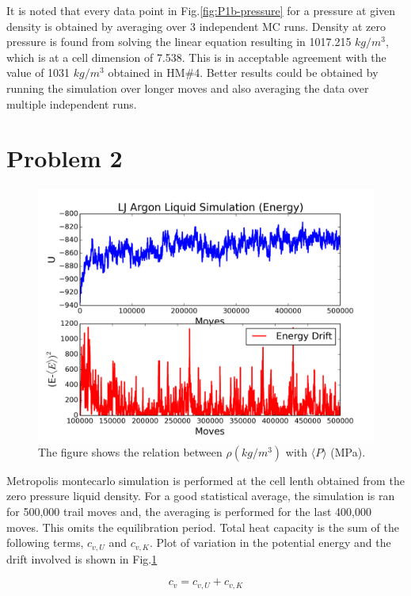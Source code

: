 \documentclass{article}
\begin{document}
It is noted that every data point in Fig.\ref{fig:P1b-pressure} for a pressure at given density is obtained by averaging over 3 independent MC runs. Density at zero pressure is found from solving the linear equation resulting in 1017.215 $kg/m^3$, which is at a cell dimension of 7.538. This is in acceptable agreement with the value of 1031 $kg/m^3$ obtained in HM\#4. Better results could be obtained by running the simulation over longer moves and also averaging the data over multiple independent runs.

\section{Problem 2}
\label{sec-2}
\begin{figure}[htb]
\centering
\includegraphics[width=.9\linewidth]{./P2/LJ-md-Ener.png}
\caption{\label{fig:P2}The figure shows the relation between $\rho(kg/m^3)$ with $\langle P \rangle$ (MPa).}
\end{figure}

Metropolis montecarlo simulation is performed at the cell lenth obtained from the zero pressure liquid density. For a good statistical average, the simulation is ran for 500,000 trail moves and, the averaging is performed for the last 400,000 moves. This omits the equilibration period. Total heat capacity is the sum of the following terms, $c_{v,U}$ and $c_{v,K}$. Plot of variation in the potential energy and the drift involved is shown in Fig.\ref{fig:P2}

\begin{equation}
c_{v} = c_{v,U} + c_{v,K}
\end{equation}
\end{document}
